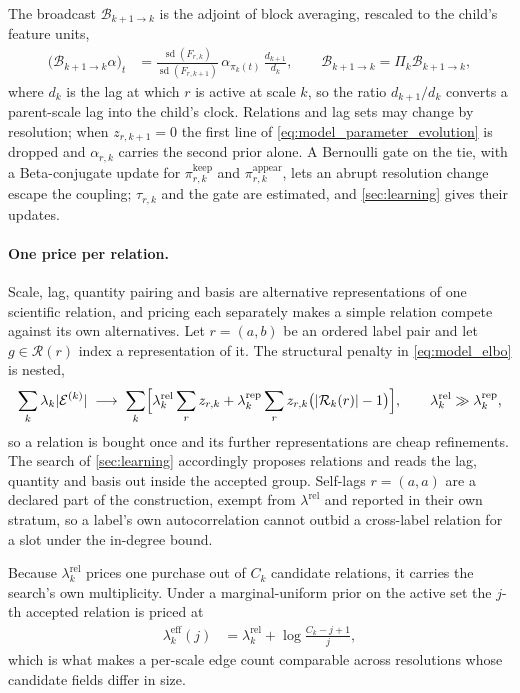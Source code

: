 The broadcast \(\mathcal B_{k+1\to k}\) is the adjoint of block averaging,
rescaled to the child's feature units,
\begin{align}
 \bigl(\mathcal B_{k+1\to k}\alpha\bigr)_{t}
 &=\frac{\operatorname{sd}(F_{r,k})}{\operatorname{sd}(F_{r,k+1})}\,
 \alpha_{\pi_k(t)}\,\frac{d_{k+1}}{d_k},
 \qquad
 \mathcal B_{k+1\to k}=\Pi_k\mathcal B_{k+1\to k},
 \label{eq:model_broadcast}
\end{align}
where \(d_k\) is the lag at which \(r\) is active at scale \(k\), so the ratio
\(d_{k+1}/d_k\) converts a parent-scale lag into the child's clock. Relations
and lag sets may change by resolution; when \(z_{r,k+1}=0\) the first line of
\cref{eq:model_parameter_evolution} is dropped and \(\alpha_{r,k}\) carries the
second prior alone. A Bernoulli gate on the tie, with a Beta-conjugate update
for \(\pi_{r,k}^{\mathrm{keep}}\) and \(\pi_{r,k}^{\mathrm{appear}}\), lets an
abrupt resolution change escape the coupling; \(\tau_{r,k}\) and the gate are
estimated, and \cref{sec:learning} gives their updates.

\paragraph{One price per relation.}

Scale, lag, quantity pairing and basis are alternative representations of one
scientific relation, and pricing each separately makes a simple relation
compete against its own alternatives. Let \(r=(a,b)\) be an ordered label pair
and let \(g\in\mathcal R(r)\) index a representation of it. The structural
penalty in \cref{eq:model_elbo} is nested,
\begin{align}
 \sum_k\lambda_k|\mathcal E^{(k)}|
 \;\longrightarrow\;
 \sum_k\Bigl[
 \lambda_k^{\mathrm{rel}}\sum_r z_{r,k}
 +\lambda_k^{\mathrm{rep}}\sum_r z_{r,k}\bigl(|\mathcal R_k(r)|-1\bigr)
 \Bigr],
 \qquad
 \lambda_k^{\mathrm{rel}}\gg\lambda_k^{\mathrm{rep}},
 \label{eq:model_group_price}
\end{align}
so a relation is bought once and its further representations are cheap
refinements. The search of \cref{sec:learning} accordingly proposes relations
and reads the lag, quantity and basis out inside the accepted group. Self-lags
\(r=(a,a)\) are a declared part of the construction, exempt from
\(\lambda^{\mathrm{rel}}\) and reported in their own stratum, so a label's own
autocorrelation cannot outbid a cross-label relation for a slot under the
in-degree bound.

Because \(\lambda_k^{\mathrm{rel}}\) prices one purchase out of \(C_k\)
candidate relations, it carries the search's own multiplicity. Under a
marginal-uniform prior on the active set the \(j\)-th accepted relation is
priced at
\begin{align}
 \lambda_k^{\mathrm{eff}}(j)
 &=\lambda_k^{\mathrm{rel}}+\log\frac{C_k-j+1}{j},
 \label{eq:model_multiplicity_price}
\end{align}
which is what makes a per-scale edge count comparable across resolutions whose
candidate fields differ in size.


